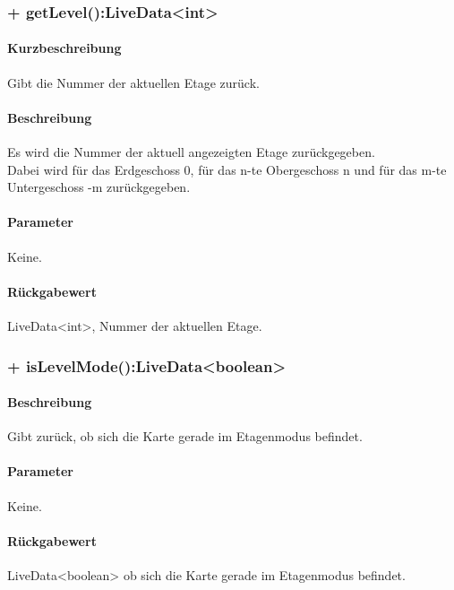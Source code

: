 \subsubsection{+ getLevel():LiveData<int>}%
\paragraph*{Kurzbeschreibung}
Gibt die Nummer der aktuellen Etage zurück.
\paragraph*{Beschreibung}
Es wird die Nummer der aktuell angezeigten Etage zurückgegeben.\\
Dabei wird für das Erdgeschoss 0, für das n-te Obergeschoss n und für das 
m-te Untergeschoss -m zurückgegeben.
\paragraph*{Parameter}
Keine.
\paragraph*{Rückgabewert}
LiveData<int>, Nummer der aktuellen Etage.

\subsubsection{+ isLevelMode():LiveData<boolean>}%
\paragraph*{Beschreibung}
Gibt zurück, ob sich die Karte gerade im Etagenmodus befindet.
\paragraph*{Parameter}
Keine.
\paragraph*{Rückgabewert}
LiveData<boolean> ob sich die Karte gerade im Etagenmodus befindet.
